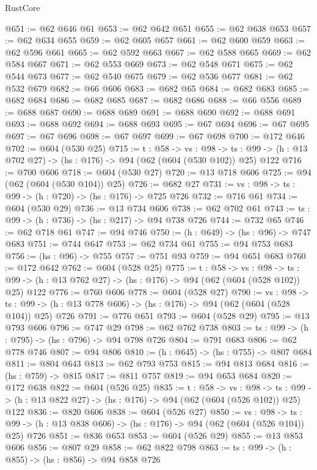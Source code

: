 \begin{lexlean}{RustCore}
\begin{coremodule}
@651 := @62 @646 @61
@653 := @62 @642 @651
@655 := @62 @638 @653
@657 := @62 @634 @655
@659 := @62 @605 @657
@661 := @62 @600 @659
@663 := @62 @596 @661
@665 := @62 @592 @663
@667 := @62 @588 @665
@669 := @62 @584 @667
@671 := @62 @553 @669
@673 := @62 @548 @671
@675 := @62 @544 @673
@677 := @62 @540 @675
@679 := @62 @536 @677
@681 := @62 @532 @679
@682 := @66 @606
@683 := @682 @65
@684 := @682 @683
@685 := @682 @684
@686 := @682 @685
@687 := @682 @686
@688 := @66 @556
@689 := @688 @687
@690 := @688 @689
@691 := @688 @690
@692 := @688 @691
@693 := @688 @692
@694 := @688 @693
@695 := @67 @694
@696 := @67 @695
@697 := @67 @696
@698 := @67 @697
@699 := @67 @698
@700 := @172 @646
@702 := @604 (@530 @25)
@715 := {t : @58} ->
  {vs : @98} ->
  {ts : @99} -> (h : @13 @702 @27) -> (hs : @176) -> @94 (@62 (@604 (@530 @102)) @25) @122
@716 := @700 @606
@718 := @604 (@530 @27)
@720 := @13 @718 @606
@725 := @94 (@62 (@604 (@530 @104)) @25)
@726 := @682 @27
@731 := {vs : @98} -> {ts : @99} -> (h : @720) -> (hs : @176) -> @725 @726
@732 := @716 @61
@734 := @604 (@530 @29)
@736 := @13 @734 @606
@738 := @62 @702 @61
@743 := {ts : @99} -> (h : @736) -> (hs : @217) -> @94 @738 @726
@744 := @732 @65
@746 := @62 @718 @61
@747 := @94 @746
@750 := (h : @649) -> (hs : @96) -> @747 @683
@751 := @744 @647
@753 := @62 @734 @61
@755 := @94 @753 @683
@756 := (hs : @96) -> @755
@757 := @751 @93
@759 := @94 @651 @683
@760 := @172 @642
@762 := @604 (@528 @25)
@775 := {t : @58} ->
  {vs : @98} ->
  {ts : @99} -> (h : @13 @762 @27) -> (hs : @176) -> @94 (@62 (@604 (@528 @102)) @25) @122
@776 := @760 @606
@778 := @604 (@528 @27)
@790 := {vs : @98} ->
  {ts : @99} -> (h : @13 @778 @606) -> (hs : @176) -> @94 (@62 (@604 (@528 @104)) @25) @726
@791 := @776 @651
@793 := @604 (@528 @29)
@795 := @13 @793 @606
@796 := @747 @29
@798 := @62 @762 @738
@803 := {ts : @99} -> (h : @795) -> (hs : @796) -> @94 @798 @726
@804 := @791 @683
@806 := @62 @778 @746
@807 := @94 @806
@810 := (h : @645) -> (hs : @755) -> @807 @684
@811 := @804 @643
@813 := @62 @793 @753
@815 := @94 @813 @684
@816 := (hs : @759) -> @815
@817 := @811 @757
@819 := @94 @653 @684
@820 := @172 @638
@822 := @604 (@526 @25)
@835 := {t : @58} ->
  {vs : @98} ->
  {ts : @99} -> (h : @13 @822 @27) -> (hs : @176) -> @94 (@62 (@604 (@526 @102)) @25) @122
@836 := @820 @606
@838 := @604 (@526 @27)
@850 := {vs : @98} ->
  {ts : @99} -> (h : @13 @838 @606) -> (hs : @176) -> @94 (@62 (@604 (@526 @104)) @25) @726
@851 := @836 @653
@853 := @604 (@526 @29)
@855 := @13 @853 @606
@856 := @807 @29
@858 := @62 @822 @798
@863 := {ts : @99} -> (h : @855) -> (hs : @856) -> @94 @858 @726

\end{coremodule}
\end{lexlean}
